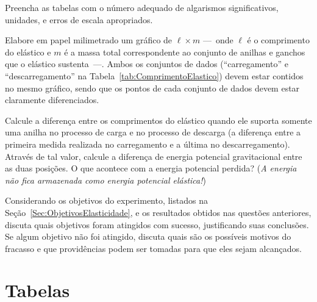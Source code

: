 \begin{question}[type={exam}]{1.5}
Preencha as tabelas com o número adequado de algarismos significativos, unidades, e erros de escala apropriados. 
\end{question}


\begin{question}[type={exam}]{2.5}
Elabore em papel milimetrado um gráfico de $\ell \times m$ ---~onde $\ell$ é o comprimento do elástico e $m$ é a massa total correspondente ao conjunto de anilhas e ganchos que o elástico sustenta~---. Ambos os conjuntos de dados (``carregamento'' e ``descarregamento'' na Tabela~\ref{tab:ComprimentoElastico}) devem estar contidos no mesmo gráfico, sendo que os pontos de cada conjunto de dados devem estar claramente diferenciados.
\end{question}

\begin{question}[type={exam}]{2}
Calcule a diferença entre os comprimentos do elástico quando ele suporta somente uma anilha no processo de carga e no processo de descarga (a diferença entre a primeira medida realizada no carregamento e a última no descarregamento). Através de tal valor, calcule a diferença de energia potencial gravitacional entre as duas posições. O que acontece com a energia potencial perdida? (\emph{A energia não fica armazenada como energia potencial elástica!})
\end{question}

\begin{question}[type={exam}]{1.5}
Considerando os objetivos do experimento, listados na Seção~\ref{Sec:ObjetivosElasticidade}, e os resultados obtidos nas questões anteriores, discuta quais objetivos foram atingidos com sucesso, justificando suas conclusões. Se algum objetivo não foi atingido, discuta quais são os possíveis motivos do fracasso e que providências podem ser tomadas para que eles sejam alcançados.
\end{question}
\vfill

\pagebreak
\section{Tabelas}

